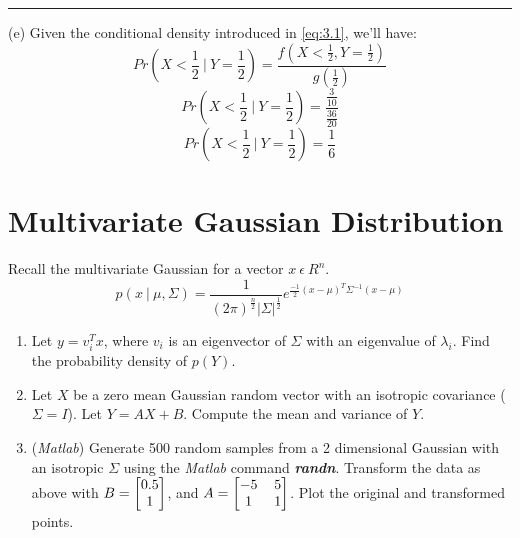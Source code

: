 \documentclass[12pt]{article}
\numberwithin{equation}{section}
\numberwithin{table}{section}
\numberwithin{figure}{section}
\begin{document}
\noindent\rule{\textwidth}{.5pt}
(e) Given the conditional density introduced in \ref{eq:3.1}, we'll have:
$$
	Pr(X < \frac{1}{2}\ |\ Y = \frac{1}{2}) = \frac{f(X < \frac{1}{2}, Y = \frac{1}{2})}{g(\frac{1}{2})}
$$
$$
	Pr(X < \frac{1}{2}\ |\ Y = \frac{1}{2}) = \frac{\frac{3}{10}}{\frac{36}{20}}
$$
$$
	Pr(X < \frac{1}{2}\ |\ Y = \frac{1}{2}) = \frac{1}{6}
$$
\newpage

\section{Multivariate Gaussian Distribution}
Recall the multivariate Gaussian for a vector $x\ \epsilon\ R^n$.
\begin{equation}\label{eq:4.1}
	p(x\ |\ \mu, \Sigma) = \frac{1}{(2\pi)^\frac{n}{2}|\Sigma|^\frac{1}{2}} e^{\frac{-1}{2}(x - \mu)^T\Sigma^{-1}(x - \mu)} 
\end{equation}

\begin{enumerate}[label=(\alph*)]
	\item Let $y=v_i^Tx$, where $v_i$ is an eigenvector of $\Sigma$ with an eigenvalue of $\lambda_i$. Find the probability density of $p(Y)$.
	
	\item Let $X$ be a zero mean Gaussian random vector with an isotropic covariance ($\Sigma  = I$). Let $Y = AX + B$. Compute the mean and variance of $Y$.
	
	\item (\textit{Matlab}) Generate 500 random samples from a 2 dimensional Gaussian with an isotropic $\Sigma$ using the \textit{Matlab} command \textit{\textbf{randn}}. Transform the data as above with
	$
	B = 
	\renewcommand\arraystretch{1}
	\setlength\arraycolsep{6pt}
	\begin{bmatrix}
	0.5 \\
	1 \\
	\end{bmatrix}
	$, and $
	A = 
	\renewcommand\arraystretch{1}
	\setlength\arraycolsep{6pt}
	\begin{bmatrix}
	-5 & 5 \\
	1 & 1 \\
	\end{bmatrix}
	$. Plot the original and transformed points.
	
\end{enumerate}
\end{document}
